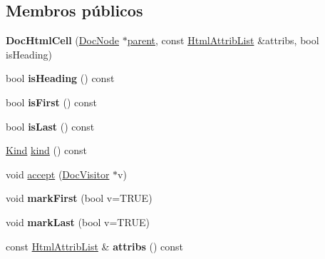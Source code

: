 \subsection*{Membros públicos}
\begin{DoxyCompactItemize}
\item 
\hypertarget{class_doc_html_cell_a39afff40d81ee75c88309cc6ef405328}{{\bfseries Doc\-Html\-Cell} (\hyperlink{class_doc_node}{Doc\-Node} $\ast$\hyperlink{class_doc_node_abd7f070d6b0a38b4da71c2806578d19d}{parent}, const \hyperlink{class_html_attrib_list}{Html\-Attrib\-List} \&attribs, bool is\-Heading)}\label{class_doc_html_cell_a39afff40d81ee75c88309cc6ef405328}

\item 
\hypertarget{class_doc_html_cell_ade05d6ce722372f5c6779febf0ffab8b}{bool {\bfseries is\-Heading} () const }\label{class_doc_html_cell_ade05d6ce722372f5c6779febf0ffab8b}

\item 
\hypertarget{class_doc_html_cell_af018468130393cdae58e14a36980f94c}{bool {\bfseries is\-First} () const }\label{class_doc_html_cell_af018468130393cdae58e14a36980f94c}

\item 
\hypertarget{class_doc_html_cell_a8dad52a23ff99a58cb64461598a11d5c}{bool {\bfseries is\-Last} () const }\label{class_doc_html_cell_a8dad52a23ff99a58cb64461598a11d5c}

\item 
\hyperlink{class_doc_node_aa10c9e8951b8ccf714a59ec321bdac5b}{Kind} \hyperlink{class_doc_html_cell_aa9d037bed9f9a083d0cd01485637d843}{kind} () const 
\item 
void \hyperlink{class_doc_html_cell_a7ba716e854ae2f8f87a4eb2140e302b6}{accept} (\hyperlink{class_doc_visitor}{Doc\-Visitor} $\ast$v)
\item 
\hypertarget{class_doc_html_cell_a7d3af17d92bf948006d448691283290c}{void {\bfseries mark\-First} (bool v=T\-R\-U\-E)}\label{class_doc_html_cell_a7d3af17d92bf948006d448691283290c}

\item 
\hypertarget{class_doc_html_cell_a9d9fd09f1f4baa960c94af1d41c60f95}{void {\bfseries mark\-Last} (bool v=T\-R\-U\-E)}\label{class_doc_html_cell_a9d9fd09f1f4baa960c94af1d41c60f95}

\item 
\hypertarget{class_doc_html_cell_aae3c838ea3d3273b35d07e9965a8985e}{const \hyperlink{class_html_attrib_list}{Html\-Attrib\-List} \& {\bfseries attribs} () const }\label{class_doc_html_cell_aae3c838ea3d3273b35d07e9965a8985e}


\end{DoxyCompactItemize}

